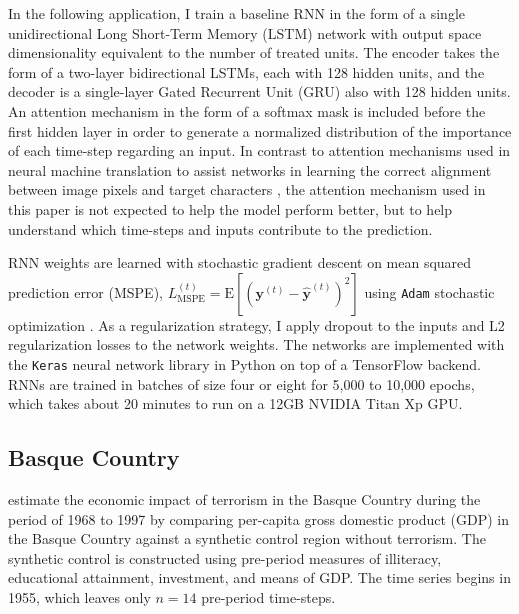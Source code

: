 \documentclass[hidelinks,12pt]{article}
\newcommand{\E}{\mathrm{E}}
\begin{document}
In the following application, I train a baseline RNN in the form of a single unidirectional Long Short-Term Memory (LSTM) network \citep{schmidhuber1997long} with output space dimensionality equivalent to the number of treated units. The encoder takes the form of a two-layer bidirectional LSTMs, each with 128 hidden units, and the decoder is a single-layer Gated Recurrent Unit (GRU) \citep{chung2014} also with 128 hidden units. An attention mechanism in the form of a softmax mask is included before the first hidden layer in order to generate a normalized distribution of the importance of each time-step regarding an input. In contrast to attention mechanisms used in neural machine translation to assist networks in learning the correct alignment between image pixels and target characters \citep{cho2014learning,2017arXiv171204046P}, the attention mechanism used in this paper is not expected to help the model perform better, but to help understand which time-steps and inputs contribute to the prediction.

RNN weights are learned with stochastic gradient descent on mean squared prediction error (MSPE), $L^{(t)}_{\text{MSPE}} = \E \left[\left(\mathbf{y}^{(t)} - \mathbf{\hat{y}}^{(t)} \right)^2 \right]$ using \texttt{Adam} stochastic optimization \citep{kingma2014adam}. As a regularization strategy, I apply dropout to the inputs and L2 regularization losses to the network weights. The networks are implemented with the \texttt{Keras} neural network library \citep{chollet2015keras} in Python on top of a TensorFlow backend. RNNs are trained in batches of size four or eight for 5,000 to 10,000 epochs, which takes about 20 minutes to run on a 12GB NVIDIA Titan Xp GPU.

\subsection{Basque Country} 


\citet{abadie2003economic} estimate the economic impact of terrorism in the Basque Country during the period of 1968 to 1997 by comparing per-capita gross domestic product (GDP) in the Basque Country against a synthetic control region without terrorism. The synthetic control is constructed using pre-period measures of illiteracy, educational attainment, investment, and means of GDP. The time series begins in 1955, which leaves only $n = 14$ pre-period time-steps. 
\end{document}
